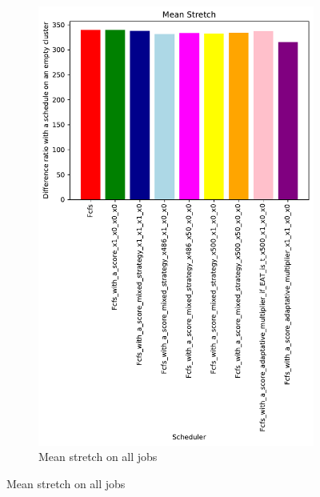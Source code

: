 \documentclass[a4paper]{article}
\begin{document}
\begin{figure}[H]
\begin{subfigure}[b]{0.4\linewidth}\centering\includegraphics[width=0.9\linewidth]{MBSS/plot/Results_FCFS_Score_Adaptative_Multiplier_2022-05-21->2022-05-22_V9271_Mean_Stretch_450_128_32_256_4_1024.pdf}\caption{Mean stretch on all jobs}\end{subfigure}

\end{figure}
\end{document}

